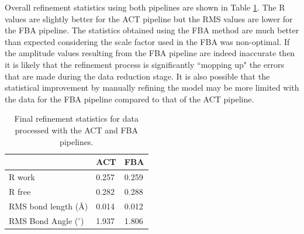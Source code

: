 Overall refinement statistics using both pipelines are shown in Table \ref{tab:Refinement statistics - C.Esp1396I}.
The R values are slightly better for the ACT pipeline but the RMS values are lower for the FBA pipeline.
The statistics obtained using the FBA method are much better than expected considering the scale factor used in the FBA was non-optimal.
If the amplitude values resulting from the FBA pipeline are indeed inaccurate then it is likely that the refinement process is significantly ``mopping up" the errors that are made during the data reduction stage.
It is also possible that the statistical improvement by manually refining the model may be more limited with the data for the FBA pipeline compared to that of the ACT pipeline.
\begin{table}[ht!]
	\caption[Final refinement statistics for data processed with the ACT and FBA pipelines.]{Final refinement statistics for data processed with the ACT and FBA pipelines.}
	\centering
	\begin{tabular}{p{4cm} | p{2.5cm} | p{2.5cm}}
		   & ACT & FBA  \\
		\hline
		R work                      & 0.257   & 0.259 \\
		R free                      & 0.282   & 0.288 \\
		RMS bond length (\AA)       & 0.014   & 0.012 \\
        RMS Bond Angle ($^{\circ}$) & 1.937   & 1.806 \\
		\hline
	\end{tabular}
	\label{tab:Refinement statistics - C.Esp1396I}
\end{table}
